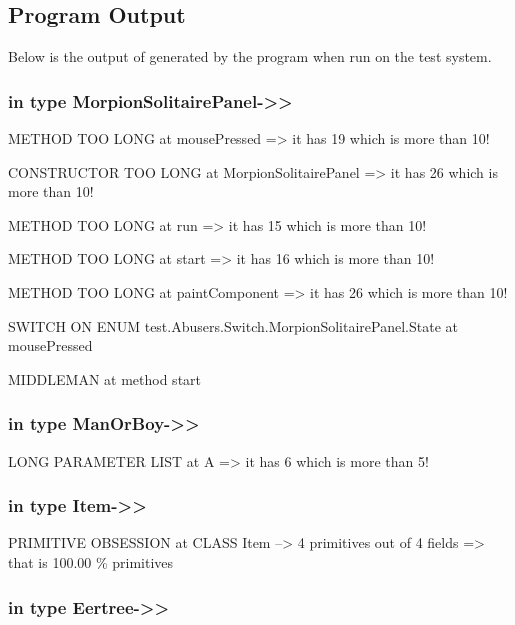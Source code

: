 \documentclass[a4paper]{article}
\begin{document}
\subsection{Program Output}
Below is the output of generated by the program when run on the test system.


\begin{flushleft}
	\subsubsection{in type
		MorpionSolitairePanel-\textgreater{}\textgreater{}}\label{in-type-morpionsolitairepanel-}

	METHOD TOO LONG at mousePressed =\textgreater{} it has 19 which is more
	than 10!

	CONSTRUCTOR TOO LONG at MorpionSolitairePanel =\textgreater{} it has 26
	which is more than 10!

	METHOD TOO LONG at run =\textgreater{} it has 15 which is more than 10!

	METHOD TOO LONG at start =\textgreater{} it has 16 which is more than
	10!

	METHOD TOO LONG at paintComponent =\textgreater{} it has 26 which is
	more than 10!

	SWITCH ON ENUM test.Abusers.Switch.MorpionSolitairePanel.State at
	mousePressed

	MIDDLEMAN at method start

	\subsubsection{in type
		ManOrBoy-\textgreater{}\textgreater{}}\label{in-type-manorboy-}

	LONG PARAMETER LIST at A =\textgreater{} it has 6 which is more than 5!

	\subsubsection{in type Item-\textgreater{}\textgreater{}}\label{in-type-item-}

	PRIMITIVE OBSESSION at CLASS Item --\textgreater{} 4 primitives out of 4
	fields =\textgreater{} that is 100.00 \% primitives

	\subsubsection{in type
		Eertree-\textgreater{}\textgreater{}}\label{in-type-eertree-}


\end{flushleft}
\end{document}
